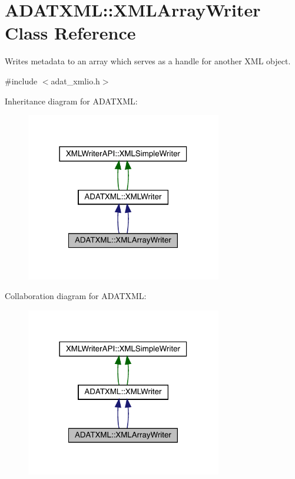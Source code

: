 \hypertarget{classADATXML_1_1XMLArrayWriter}{}\section{A\+D\+A\+T\+X\+ML\+:\+:X\+M\+L\+Array\+Writer Class Reference}
\label{classADATXML_1_1XMLArrayWriter}


Writes metadata to an array which serves as a handle for another X\+ML object.  




{\ttfamily \#include $<$adat\+\_\+xmlio.\+h$>$}



Inheritance diagram for A\+D\+A\+T\+X\+ML\+:\nopagebreak
\begin{figure}[H]
\begin{center}
\leavevmode
\includegraphics[width=242pt]{d9/d9b/classADATXML_1_1XMLArrayWriter__inherit__graph}
\end{center}
\end{figure}


Collaboration diagram for A\+D\+A\+T\+X\+ML\+:\nopagebreak
\begin{figure}[H]
\begin{center}
\leavevmode
\includegraphics[width=242pt]{d9/d05/classADATXML_1_1XMLArrayWriter__coll__graph}
\end{center}
\end{figure}
